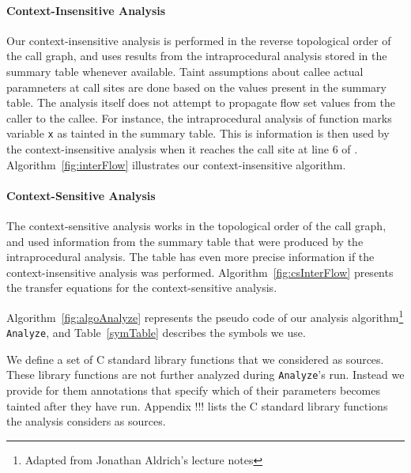 \paragraph{Context-Insensitive Analysis}
Our context-insensitive analysis is performed
in the reverse topological order of the call graph,
and uses results from the intraprocedural analysis
stored in the summary table whenever available.
Taint assumptions about callee actual paramneters
at call sites are done based on the values present
in the summary table. The analysis itself does not
attempt to propagate flow set values from the caller
to the callee.
For instance, the intraprocedural analysis of function
\main{} marks variable \texttt{x} as tainted in the
summary table. This is information is then used by
the context-insensitive analysis when it reaches the
call site at line $6$ of \main{}.
Algorithm~\ref{fig:interFlow} illustrates our context-insensitive
algorithm.


\paragraph{Context-Sensitive Analysis}
The context-sensitive analysis works in the topological order
of the call graph, and used information from the summary table
that were produced by the intraprocedural analysis. The table
has even more precise information if the context-insensitive
analysis was performed.
Algorithm~\ref{fig:csInterFlow} presents the transfer equations
for the context-sensitive analysis.
 
Algorithm~\ref{fig:algoAnalyze} represents the pseudo code of
our analysis algorithm\footnote{Adapted from Jonathan Aldrich's
lecture notes} \texttt{Analyze}, and Table~\ref{symTable}
describes the symbols we use.

We define a set of C standard library functions that
we considered as sources. These library functions are not
further analyzed during \texttt{Analyze}'s run.
Instead we provide for them annotations that specify
which of their parameters becomes tainted after they
have run. Appendix !!! lists the C standard library
functions the analysis considers as sources.

